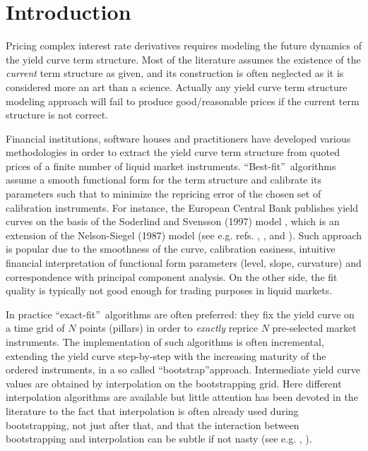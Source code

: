 \documentclass[11pt,reqno]{amsart}
\begin{document}
\maketitle

\section{\label{SecIntro}Introduction}
Pricing complex interest rate derivatives requires modeling the future dynamics of the yield curve term structure. Most of the literature assumes the existence of the \emph{current} term structure as given, and its construction is often neglected as it is considered more an art than a science. Actually any yield curve term structure modeling approach will fail to produce good/reasonable prices if the current term structure is not correct.

Financial institutions, software houses and practitioners have developed various methodologies in order to extract the yield curve term structure from quoted prices of a finite number of liquid market instruments. \textquotedblleft Best-fit\textquotedblright\ algorithms assume a smooth functional form for the term structure and calibrate its parameters such that to minimize the repricing error of the chosen set of calibration instruments. For instance, the European Central Bank publishes yield curves on the basis of the Soderlind and Svensson (1997) model \cite{SodSwe97}, which is an extension of the Nelson-Siegel (1987) model (see e.g. refs. \cite{NelSie97}, \cite{Diament}, \cite{ChrDie07} and \cite{Cor08}). Such approach is popular due to the smoothness of the curve, calibration easiness, intuitive financial interpretation of functional form parameters (level, slope, curvature) and correspondence with principal component analysis. On the other side, the fit quality is typically not good enough for trading purposes in liquid markets.
\par
In practice \textquotedblleft exact-fit\textquotedblright\ algorithms are often preferred: they fix the yield curve on a time grid of $N$ points (pillars) in order to \emph{exactly} reprice $N$ pre-selected market instruments. The implementation of such algorithms is often incremental, extending the yield curve step-by-step with the increasing maturity of the ordered instruments, in a so called \textquotedblleft bootstrap\textquotedblright approach. Intermediate yield curve values are obtained by interpolation on the bootstrapping grid. Here different interpolation algorithms are available but little attention has been devoted in the literature to the fact that interpolation is often already used during bootstrapping, not just after that, and that the interaction between bootstrapping and interpolation can be subtle if not nasty (see e.g. \cite{HagWes06}, \cite{HagWes08}).
\end{document}
